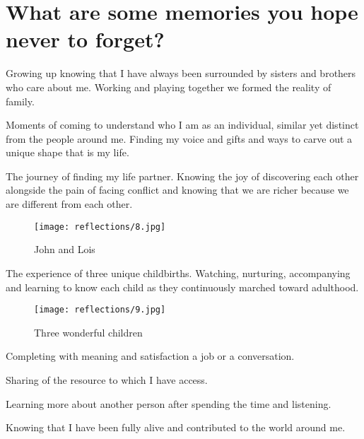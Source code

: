 \section{What are some memories you hope never to forget?}
Growing up knowing that I have always been surrounded by sisters and brothers who care about me.
Working and playing together we formed the reality of family.

Moments of coming to understand who I am as an individual, similar yet distinct from the people around me.
Finding my voice and gifts and ways to carve out a unique shape that is my life.

The journey of finding my life partner.
Knowing the joy of discovering each other alongside the pain of facing conflict and knowing that we are richer because we are different from each other.

\begin{figure}
\centering
\texttt{[image: reflections/8.jpg]}
\caption{
John and Lois
}
\end{figure}

The experience of three unique childbirths.
Watching, nurturing, accompanying and learning to know each child as they continuously marched toward adulthood.

\begin{figure}
\centering
\texttt{[image: reflections/9.jpg]}
\caption{
Three wonderful children
}
\end{figure}

Completing with meaning and satisfaction a job or a conversation.

Sharing of the resource to which I have access.

Learning more about another person after spending the time and listening.

Knowing that I have been fully alive and contributed to the world around me.






